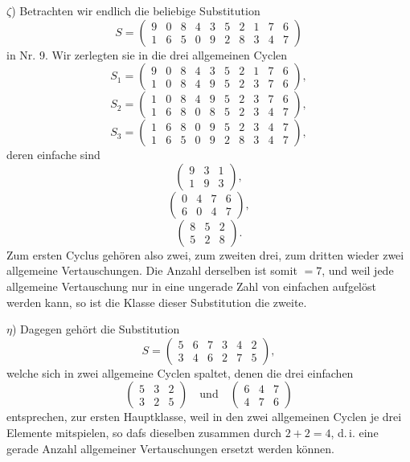 \documentclass[11pt]{article}
\begin{document}
$\zeta$) Betrachten wir endlich die beliebige Substitution
\[
S = \begin{pmatrix} 9 & 0 & 8 & 4 & 3 & 5 & 2 & 1 & 7 & 6 \\ 1 & 6 & 5 & 0 & 9 & 2 & 8 & 3 & 4 & 7 \end{pmatrix}
\]
in Nr. 9. Wir zerlegten sie in die drei allgemeinen Cyclen
\[
S_1 = \begin{pmatrix} 9 & 0 & 8 & 4 & 3 & 5 & 2 & 1 & 7 & 6 \\ 1 & 0 & 8 & 4 & 9 & 5 & 2 & 3 & 7 & 6 \end{pmatrix},
\]
\[
S_2 = \begin{pmatrix} 1 & 0 & 8 & 4 & 9 & 5 & 2 & 3 & 7 & 6 \\ 1 & 6 & 8 & 0 & 8 & 5 & 2 & 3 & 4 & 7 \end{pmatrix},
\]
\[
S_3 = \begin{pmatrix} 1 & 6 & 8 & 0 & 9 & 5 & 2 & 3 & 4 & 7 \\ 1 & 6 & 5 & 0 & 9 & 2 & 8 & 3 & 4 & 7 \end{pmatrix},
\]
deren einfache sind
\[
\begin{pmatrix} 9 & 3 & 1 \\ 1 & 9 & 3 \end{pmatrix},
\]
\[
\begin{pmatrix} 0 & 4 & 7 & 6 \\ 6 & 0 & 4 & 7 \end{pmatrix},
\]
\[
\begin{pmatrix} 8 & 5 & 2 \\ 5 & 2 & 8 \end{pmatrix}.
\]
Zum ersten Cyclus gehören also zwei, zum zweiten drei, zum dritten wieder zwei allgemeine Vertauschungen. Die Anzahl derselben ist somit $= 7$, und weil jede allgemeine Vertauschung nur in eine ungerade Zahl von einfachen aufgelöst werden kann, so ist die Klasse dieser Substitution die zweite.

$\eta$) Dagegen gehört die Substitution
\[
S = \begin{pmatrix} 5 & 6 & 7 & 3 & 4 & 2 \\ 3 & 4 & 6 & 2 & 7 & 5 \end{pmatrix},
\]
welche sich in zwei allgemeine Cyclen spaltet, denen die drei einfachen
\[
\begin{pmatrix} 5 & 3 & 2 \\ 3 & 2 & 5 \end{pmatrix} \quad \text{und} \quad \begin{pmatrix} 6 & 4 & 7 \\ 4 & 7 & 6 \end{pmatrix}
\]
entsprechen, zur ersten Hauptklasse, weil in den zwei allgemeinen Cyclen je drei Elemente mitspielen, so dafs dieselben zusammen durch $2 + 2 = 4$, d.\,i. eine gerade Anzahl allgemeiner Vertauschungen ersetzt werden können.
\end{document}
